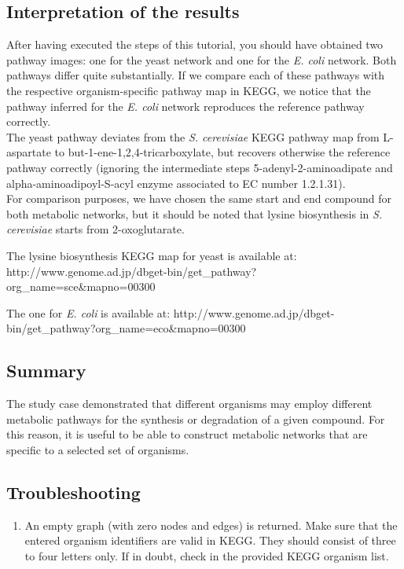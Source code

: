 \subsection{Interpretation of the results}

After having executed the steps of this tutorial, you should have obtained two pathway images:
one for the yeast network and one for the \textit{E. coli} network. Both pathways differ quite substantially.
If we compare each of these pathways with the respective organism-specific pathway map in KEGG, we notice that
the pathway inferred for the \textit{E. coli} network reproduces the reference pathway correctly.\\
The yeast pathway deviates from the \textit{S. cerevisiae} KEGG pathway map from L-aspartate to but-1-ene-1,2,4-tricarboxylate,
but recovers otherwise the reference pathway correctly (ignoring the intermediate steps 5-adenyl-2-aminoadipate and
alpha-aminoadipoyl-S-acyl enzyme associated to EC number 1.2.1.31). \\
For comparison purposes, we have chosen the same start and end compound for both metabolic networks, but it should
be noted that lysine biosynthesis in \textit{S. cerevisiae} starts from 2-oxoglutarate.

The lysine biosynthesis KEGG map for yeast is available at: http://www.genome.ad.jp/dbget-bin/get_pathway?org_name=sce&mapno=00300


The one for \textit{E. coli} is available at: http://www.genome.ad.jp/dbget-bin/get_pathway?org_name=eco&mapno=00300


\subsection{Summary}

The study case demonstrated that different organisms may employ different metabolic pathways for the synthesis or
degradation of a given compound. For this reason, it is useful to be able to construct metabolic networks that are
specific to a selected set of organisms.

\subsection{Troubleshooting}

\begin{enumerate}

\item An empty graph (with zero nodes and edges) is returned.
Make sure that the entered organism identifiers are valid in KEGG.
They should consist of three to four letters only. If in doubt,
check in the provided KEGG organism list.

\end{enumerate}

